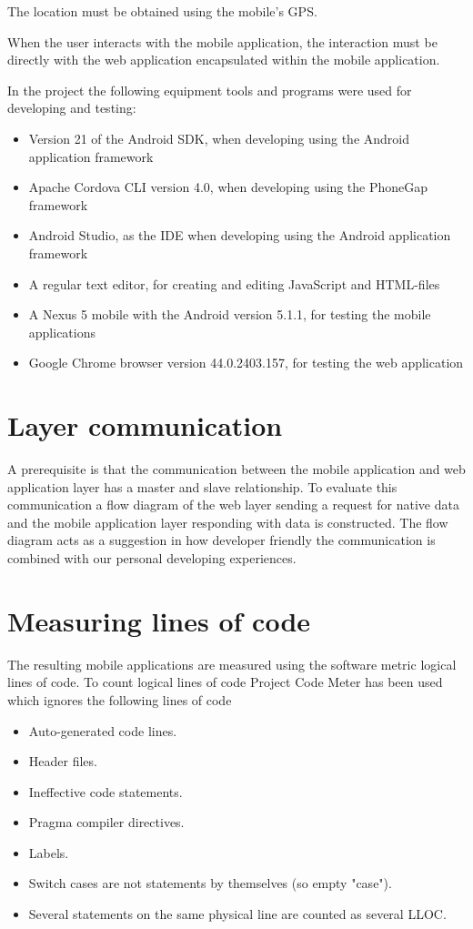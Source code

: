 The location must be obtained using the mobile’s GPS. 

When the user interacts with the mobile application, the interaction must be directly with the web application encapsulated within the mobile application. 

In the project the following equipment tools and programs were used for developing and testing:
\begin{itemize}
\item Version 21 of the Android SDK, when developing using the Android application framework
\item Apache Cordova CLI version 4.0, when developing using the PhoneGap framework
\item Android Studio, as the IDE when developing using the Android application framework
\item A regular text editor, for creating and editing JavaScript and HTML-files
\item A Nexus 5 mobile with the Android version 5.1.1, for testing the mobile applications
\item Google Chrome browser version 44.0.2403.157, for testing the web application
\end{itemize}

\section{Layer communication} \label{sec:layer-communication}
A prerequisite is that the communication between the mobile application and web application layer has a master and slave relationship. To evaluate this communication a flow diagram of the web layer sending a request for native data and the mobile application layer responding with data is constructed. The flow diagram acts as a suggestion in how developer friendly the communication is combined with our personal developing experiences.

\section{Measuring lines of code}\label{sec:measuring-lines-of-code}
The resulting mobile applications are measured using the software metric logical lines of code. To count logical lines of code Project Code Meter has been used which ignores the following lines of code~\cite{project-code-meter2015}

\begin{itemize}
\item Auto-generated code lines.
\item Header files.
\item Ineffective code statements.
\item Pragma compiler directives.
\item Labels.
\item Switch cases are not statements by themselves (so empty "case").
\item Several statements on the same physical line are counted as several LLOC.
\end{itemize}

